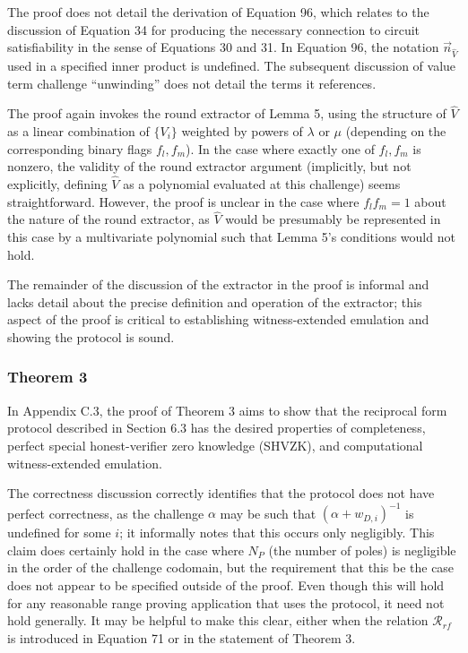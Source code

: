 \documentclass{article}
\begin{document}
The proof does not detail the derivation of Equation 96, which relates to the discussion of Equation 34 for producing the necessary connection to circuit satisfiability in the sense of Equations 30 and 31.
In Equation 96, the notation $\vec{n}_{\hat{V}}$ used in a specified inner product is undefined.
The subsequent discussion of value term challenge ``unwinding'' does not detail the terms it references.

The proof again invokes the round extractor of Lemma 5, using the structure of $\hat{V}$ as a linear combination of $\{ V_i \}$ weighted by powers of $\lambda$ or $\mu$ (depending on the corresponding binary flags $f_l, f_m$).
In the case where exactly one of $f_l, f_m$ is nonzero, the validity of the round extractor argument (implicitly, but not explicitly, defining $\hat{V}$ as a polynomial evaluated at this challenge) seems straightforward.
However, the proof is unclear in the case where $f_l f_m = 1$ about the nature of the round extractor, as $\hat{V}$ would be presumably be represented in this case by a multivariate polynomial such that Lemma 5's conditions would not hold.

The remainder of the discussion of the extractor in the proof is informal and lacks detail about the precise definition and operation of the extractor; this aspect of the proof is critical to establishing witness-extended emulation and showing the protocol is sound.


\subsubsection{Theorem 3}

In Appendix C.3, the proof of Theorem 3 aims to show that the reciprocal form protocol described in Section 6.3 has the desired properties of completeness, perfect special honest-verifier zero knowledge (SHVZK), and computational witness-extended emulation.

The correctness discussion correctly identifies that the protocol does not have perfect correctness, as the challenge $\alpha$ may be such that $(\alpha + w_{D,i})^{-1}$ is undefined for some $i$; it informally notes that this occurs only negligibly.
This claim does certainly hold in the case where $N_P$ (the number of poles) is negligible in the order of the challenge codomain, but the requirement that this be the case does not appear to be specified outside of the proof.
Even though this will hold for any reasonable range proving application that uses the protocol, it need not hold generally.
It may be helpful to make this clear, either when the relation $\mathcal{R}_{rf}$ is introduced in Equation 71 or in the statement of Theorem 3.
\end{document}
